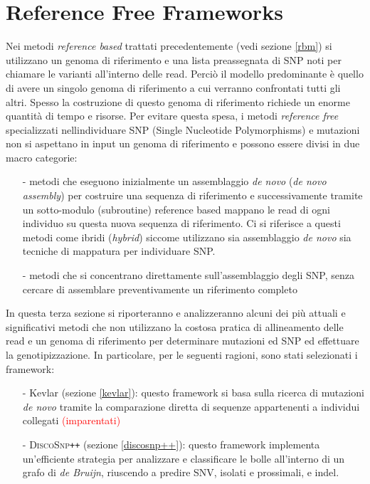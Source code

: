 \documentclass[../main.tex]{subfiles}
\begin{document}
\section{Reference Free Frameworks}
\label{rfm}

Nei metodi \textit{reference based} trattati precedentemente (vedi sezione \ref{rbm}) si utilizzano un genoma di riferimento e una lista preassegnata di SNP noti per chiamare le varianti all'interno delle read. Perciò il modello predominante è quello di avere un singolo genoma di riferimento a cui verranno confrontati tutti gli altri. Spesso la costruzione di questo genoma di riferimento richiede un enorme quantità di tempo e risorse. Per evitare questa spesa, i metodi \textit{reference free} specializzati nell\textquotesingle individuare SNP (Single Nucleotide Polymorphisms) e mutazioni non si aspettano in input un genoma di riferimento e possono essere divisi in due macro categorie:

\begin{itemize} 
\item[-] metodi che eseguono inizialmente un assemblaggio \textit{de novo} (\textit{de novo assembly}) per costruire una sequenza di riferimento e successivamente tramite un sotto-modulo (subroutine) reference based mappano le read di ogni individuo su questa nuova sequenza di riferimento. Ci si riferisce a questi metodi come ibridi (\textit{hybrid}) siccome utilizzano sia assemblaggio \textit{de novo} sia tecniche di mappatura per individuare SNP.
\item[-] metodi che si concentrano direttamente sull’assemblaggio degli SNP, senza cercare di assemblare preventivamente un riferimento completo
\end{itemize}

\noindent
In questa terza sezione si riporteranno e analizzeranno alcuni dei più attuali e significativi metodi che non utilizzano la costosa pratica di allineamento delle read e un genoma di riferimento per determinare mutazioni ed SNP ed effettuare la genotipizzazione. In particolare, per le seguenti ragioni, sono stati selezionati i framework:
\begin{itemize} 
\item[-] Kevlar (sezione \ref{kevlar}): questo framework \cite{standage2019kevlar} si basa sulla ricerca di mutazioni \textit{de novo} tramite la comparazione diretta di sequenze appartenenti a individui collegati \textcolor{red}{(imparentati)}
\item[-] \textsc{DiscoSnp}\texttt{++} (sezione \ref{discosnp++}): questo framework \cite{peterlongo2017discosnp++} implementa un'efficiente strategia per analizzare e classificare le bolle all'interno di un grafo di \textit{de Bruijn}, riuscendo a predire SNV, isolati e prossimali, e indel.
\end{itemize}
\end{document}
